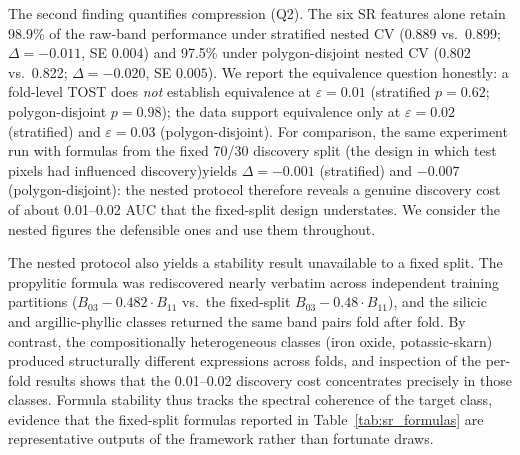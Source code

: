 \documentclass[preprint,authoryear,number]{elsarticle}
\begin{document}
The second finding quantifies compression (Q2). The six SR features alone retain 98.9\% of the raw-band performance under stratified nested CV (0.889 vs.\ 0.899; $\Delta = -0.011$, SE $0.004$) and 97.5\% under polygon-disjoint nested CV (0.802 vs.\ 0.822; $\Delta = -0.020$, SE $0.005$). We report the equivalence question honestly: a fold-level TOST does \emph{not} establish equivalence at $\varepsilon = 0.01$ (stratified $p = 0.62$; polygon-disjoint $p = 0.98$); the data support equivalence only at $\varepsilon = 0.02$ (stratified) and $\varepsilon = 0.03$ (polygon-disjoint). For comparison, the same experiment run with formulas from the fixed 70/30 discovery split (the design in which test pixels had influenced discovery)yields $\Delta = -0.001$ (stratified) and $-0.007$ (polygon-disjoint): the nested protocol therefore reveals a genuine discovery cost of about 0.01--0.02 AUC that the fixed-split design understates. We consider the nested figures the defensible ones and use them throughout.

The nested protocol also yields a stability result unavailable to a fixed split. The propylitic formula was rediscovered nearly verbatim across independent training partitions ($B_{03} - 0.482 \cdot B_{11}$ vs.\ the fixed-split $B_{03} - 0.48 \cdot B_{11}$), and the silicic and argillic-phyllic classes returned the same band pairs fold after fold. By contrast, the compositionally heterogeneous classes (iron oxide, potassic-skarn) produced structurally different expressions across folds, and inspection of the per-fold results shows that the 0.01--0.02 discovery cost concentrates precisely in those classes. Formula stability thus tracks the spectral coherence of the target class, evidence that the fixed-split formulas reported in Table~\ref{tab:sr_formulas} are representative outputs of the framework rather than fortunate draws.
\end{document}
